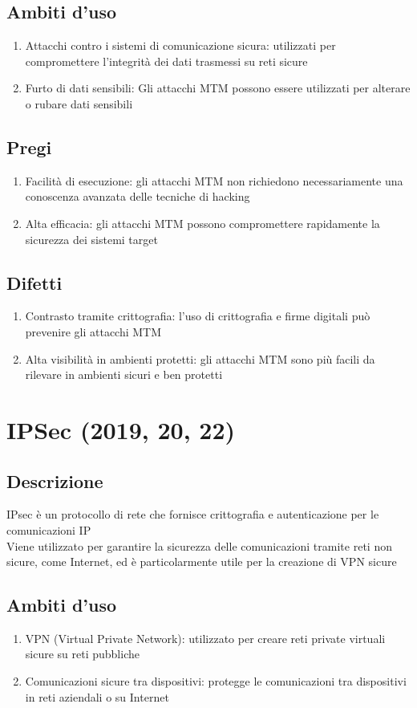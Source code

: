 \documentclass[10pt,oneside,a4paper]{article}
\begin{document}
\subsection{Ambiti d'uso}
\begin{enumerate}
\item Attacchi contro i sistemi di comunicazione sicura: utilizzati per compromettere l'integrità dei dati trasmessi su reti sicure
\item Furto di dati sensibili: Gli attacchi MTM possono essere utilizzati per alterare o rubare dati sensibili
\end{enumerate}
\subsection{Pregi}
\begin{enumerate}
\item Facilità di esecuzione: gli attacchi MTM non richiedono necessariamente una conoscenza avanzata delle tecniche di hacking
\item Alta efficacia: gli attacchi MTM possono compromettere rapidamente la sicurezza dei sistemi target
\end{enumerate}
\subsection{Difetti}
\begin{enumerate}
\item Contrasto tramite crittografia: l'uso di crittografia e firme digitali può prevenire gli attacchi MTM
\item Alta visibilità in ambienti protetti: gli attacchi MTM sono più facili da rilevare in ambienti sicuri e ben protetti
\end{enumerate}
\section{IPSec (2019, 20, 22)}
\subsection{Descrizione}
IPsec è un protocollo di rete che fornisce crittografia e autenticazione per le comunicazioni IP\\
Viene utilizzato per garantire la sicurezza delle comunicazioni tramite reti non sicure, come Internet, ed è particolarmente utile per la creazione di VPN sicure
\subsection{Ambiti d'uso}
\begin{enumerate}
\item VPN (Virtual Private Network): utilizzato per creare reti private virtuali sicure su reti pubbliche
\item Comunicazioni sicure tra dispositivi: protegge le comunicazioni tra dispositivi in reti aziendali o su Internet
\end{enumerate}
\end{document}

